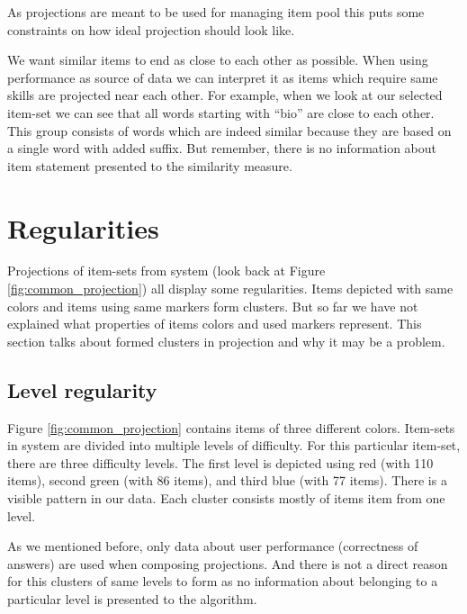 \documentclass[
  digital, %
  table,   %
  nolof,     %
  nolot,     %
  nocover,
  color
]{fithesis3}
\begin{document}

As projections are meant to be used for managing item pool this puts some constraints on how ideal projection should look like.

We want similar items to end as close to each other as possible. When using performance as source of data we can interpret it as items which require same skills are projected near each other. For example, when we look at our selected item-set we can see that all words starting with ``bio'' are close to each other. This group consists of words which are indeed similar because they are based on a single word with added suffix. But remember, there is no information about item statement presented to the similarity measure.


\section{Regularities}\label{regularities}


Projections of item-sets from system \umimeCesky{} (look back at Figure \ref{fig:common_projection}) all display some regularities. Items depicted with same colors and items using same markers form clusters. But so far we have not explained what properties of items colors and used markers represent. This section talks about formed clusters in projection and why it may be a problem.


\subsection{Level regularity}\label{regularities-level-regularity}


Figure \ref{fig:common_projection} contains items of three different colors. Item-sets in system \umimeCesky{} are divided into multiple levels of difficulty. For this particular item-set, there are three difficulty levels. The first level is depicted using red (with 110 items), second green (with 86 items), and third blue (with 77 items). There is a  visible pattern in our data. Each cluster consists mostly of items item from one level.

As we mentioned before, only data about user performance (correctness of answers) are used when composing projections. And there is not a direct reason for this clusters of same levels to form as no information about belonging to a particular level is presented to the algorithm.
\end{document}
